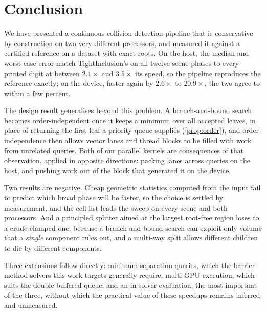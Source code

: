\section{Conclusion}
\label{sec:conclusion}

We have presented a continuous collision detection pipeline that is conservative
by construction on two very different processors, and measured it against a
certified reference on a dataset with exact roots. On the host, the median and
worst-case error match TightInclusion's on all twelve scene-phases to every
printed digit at between $2.1\times$ and $3.5\times$ its speed, so the pipeline
reproduces the reference exactly; on the device, faster again by $2.6\times$ to
$20.9\times$, the two agree to within a few percent.

The design result generalises beyond this problem. A branch-and-bound search
becomes order-independent once it keeps a minimum over all accepted leaves, in
place of returning the first leaf a priority queue supplies
(\cref{prop:order}), and order-independence then allows vector lanes and thread
blocks to be filled with work from unrelated queries. Both of our parallel
kernels are consequences of that observation, applied in opposite directions:
packing lanes across queries on the host, and pushing work out of the block that
generated it on the device.

Two results are negative. Cheap geometric statistics computed from the input
fail to predict which broad phase will be faster, so the choice is settled by
measurement, and the cell list leads the sweep on every scene and both
processors. And a principled splitter aimed at the largest root-free region
loses to a crude clamped one, because a branch-and-bound search can exploit only
volume that a \emph{single} component rules out, and a multi-way split allows
different children to die by different components.

Three extensions follow directly: minimum-separation queries, which the
barrier-method solvers this work targets generally require; multi-GPU execution,
which suits the double-buffered queue; and an in-solver evaluation, the most
important of the three, without which the practical value of these speedups
remains inferred and unmeasured.
